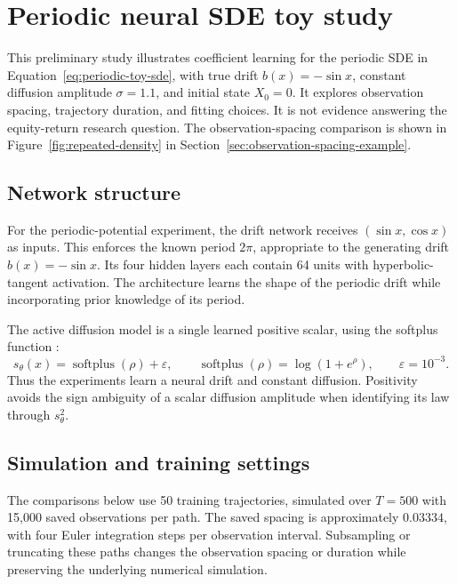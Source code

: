 \appendices

\section{Periodic neural SDE toy study}
\label{app:periodic-toy-study}

This preliminary study illustrates coefficient learning for the periodic SDE
in Equation~\eqref{eq:periodic-toy-sde}, with true drift $b(x)=-\sin x$,
constant diffusion amplitude $\sigma=1.1$, and initial state $X_0=0$.
It explores observation spacing, trajectory duration, and fitting choices.
It is not evidence answering the equity-return research question.
The observation-spacing comparison is shown in Figure~\ref{fig:repeated-density}
in Section~\ref{sec:observation-spacing-example}.

\subsection{Network structure}

For the periodic-potential experiment, the drift network receives
$(\sin x,\cos x)$ as inputs. This enforces the known period $2\pi$, appropriate
to the generating drift $b(x)=-\sin x$. Its four hidden layers each contain 64 units
with hyperbolic-tangent activation. The architecture learns the shape of the
periodic drift while incorporating prior knowledge of its period.

The active diffusion model is a single learned positive scalar, using the
softplus function \parencite{Goodfellow2016}:
\begin{equation}
    s_\theta(x)=\operatorname{softplus}(\rho)+\varepsilon,
    \qquad \operatorname{softplus}(\rho)=\log(1+e^\rho),
    \qquad \varepsilon=10^{-3}.
    \label{eq:positive-diffusion}
\end{equation}
Thus the experiments learn a neural drift and constant diffusion. Positivity
avoids the sign ambiguity of a scalar diffusion amplitude when identifying its
law through $s_\theta^2$.

\subsection{Simulation and training settings}

The comparisons below use 50 training trajectories, simulated over $T=500$
with 15,000 saved observations per path. The saved spacing is approximately
$0.03334$, with four Euler integration steps per observation interval.
Subsampling or truncating these paths changes the observation spacing or
duration while preserving the underlying numerical simulation.


